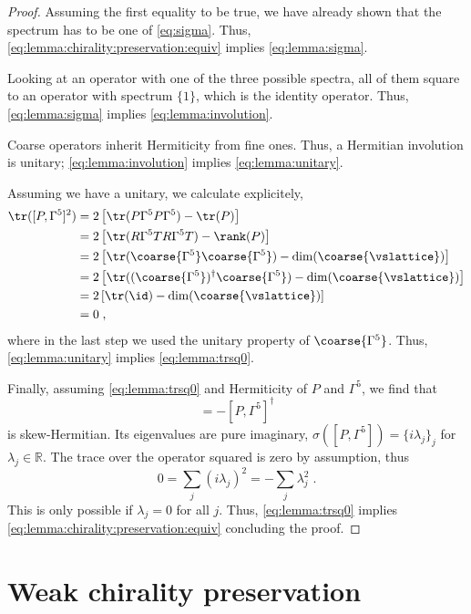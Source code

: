 \begin{proof}
Assuming the first equality to be true, we have already shown that the spectrum has to be one of \cref{eq:sigma}.
Thus, \cref{eq:lemma:chirality:preservation:equiv} implies \cref{eq:lemma:sigma}.

Looking at an operator with one of the three possible spectra, all of them square to an operator with spectrum $\{1\}$, which is the identity operator.
Thus, \cref{eq:lemma:sigma} implies \cref{eq:lemma:involution}.

Coarse operators inherit Hermiticity from fine ones.
Thus, a Hermitian involution is unitary; \cref{eq:lemma:involution} implies \cref{eq:lemma:unitary}.

Assuming we have a unitary, we calculate explicitely,
\begin{align}
\tr([P, \Gamma^{5}]^{2})
&= 2 \left[ \tr(P \Gamma^{5} P \Gamma^{5})  - \tr(P) \right] \\
&= 2 \left[ \tr(R \Gamma^{5} T R \Gamma^{5} T)  - \rank(P) \right] \\
&= 2 \left[ \tr( \coarse{\Gamma^{5}} \coarse{\Gamma^{5}} )  - \dim(\coarse{\vslattice}) \right] \\
&= 2 \left[ \tr( (\coarse{\Gamma^{5}})^{\dagger} \coarse{\Gamma^{5}} )  - \dim(\coarse{\vslattice}) \right] \\
&= 2 \left[ \tr( \id )  - \dim(\coarse{\vslattice}) \right] \\
&= 0 \;,
\end{align}
where in the last step we used the unitary property of $\coarse{\Gamma^{5}}$.
Thus, \cref{eq:lemma:unitary} implies \cref{eq:lemma:trsq0}.

Finally, assuming \cref{eq:lemma:trsq0} and Hermiticity of $P$ and $\Gamma^{5}$, we find that
\begin{equation}
[P, \Gamma^{5}] = - [P, \Gamma^{5}]^{\dagger}
\end{equation}
is skew-Hermitian.
Its eigenvalues are pure imaginary, $\sigma([P, \Gamma^{5}]) = \{ i \lambda_j\}_j$ for $\lambda_j \in \mathbb{R}$.
The trace over the operator squared is zero by assumption, thus
\begin{equation}
0 = \sum_{j} (i \lambda_j)^2 = - \sum_{j} \lambda_j^2 \;.
\end{equation}
This is only possible if $\lambda_j=0$ for all $j$.
Thus, \cref{eq:lemma:trsq0} implies \cref{eq:lemma:chirality:preservation:equiv} concluding the proof.
\end{proof}

\section{Weak chirality preservation}
\label{sec:chirality:weak}

